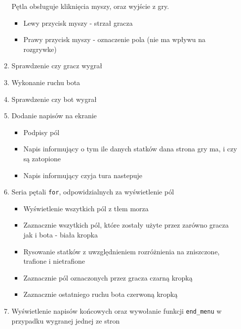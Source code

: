 \documentclass[12pt]{article}
\begin{document}
\begin{enumerate}
\begin{enumerate}
                      Pętla obsługuje kliknięcia myszy, oraz wyjście z gry.
                    \begin{itemize}
                        \item Lewy przycisk myszy - strzał gracza
                        \item Prawy przycisk myszy - oznaczenie pola (nie ma wpływu na rozgrywke)
                    \end{itemize}
                \item Sprawdzenie czy gracz wygrał
                \item Wykonanie ruchu bota
                \item Sprawdzenie czy bot wygrał
                \item Dodanie napisów na ekranie
                \begin{itemize}
                    \item Podpisy pól
                    \item Napis informujący o tym ile danych statków dana strona gry ma, i czy są zatopione
                    \item Napis informujący czyja tura nastepuje
                \end{itemize}
                \item Seria pętali \texttt{for}, odpowidzialnych za wyświetlenie pól\\
                    \begin{itemize}
                        \item Wyświetlenie wszytkich pól z tłem morza
                        \item Zaznacznie wszytkich pól, które zostały użyte przez zarówno gracza jak i bota - biała kropka
                        \item Rysowanie statków z uwzględnieniem rozróżnienia na zniszczone, trafione i nietrafione
                        \item Zaznacznie pól oznaczonych przez gracza czarną kropką
                        \item Zaznacznie ostatniego ruchu bota czerwoną kropką
                    \end{itemize}
                \item Wyświetlenie napisów końcowych oraz wywołanie funkcji \texttt{end\_menu} w przypadku wygranej jednej ze stron
            \end{enumerate}

        
    \end{enumerate}
     
\end{document}

